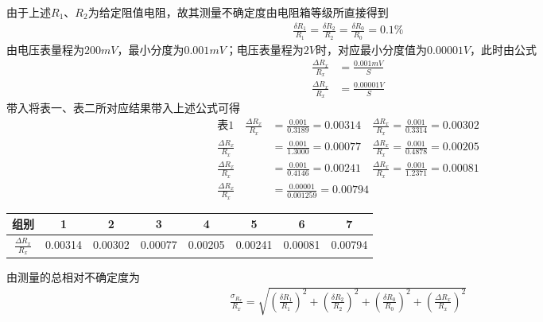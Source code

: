 \documentclass[UTF8]{ctexart}
\begin{document}
由于上述$R_1$、$R_2$为给定阻值电阻，故其测量不确定度由电阻箱等级所直接得到
\begin{align*}
    \frac{\delta R_1}{R_1} = \frac{\delta R_2}{R_2} = \frac{\delta R_0}{R_0} = 0.1\%
\end{align*}
由电压表量程为$200mV$，最小分度为$0.001mV$；电压表量程为$2V$时，对应最小分度值为$0.00001V$，此时由公式
\begin{align*}
    \frac{\Delta R_x}{R_x} &= \frac{0.001 mV}{S} \\
    \frac{\Delta R_x}{R_x} &= \frac{0.00001V}{S} 
\end{align*}
带入将表一、表二所对应结果带入上述公式可得
\begin{align*}
 \text{表1} \quad  \frac{\Delta R_x}{R_x} &= \frac{0.001}{0.3189} = 0.00314 \quad
      \frac{\Delta R_x}{R_x} = \frac{0.001}{0.3314} = 0.00302\\
    \frac{\Delta R_x}{R_x} &= \frac{0.001}{1.3000} = 0.00077\quad
    \frac{\Delta R_x}{R_x} = \frac{0.001}{0.4878} = 0.00205 \\
    \frac{\Delta R_x}{R_x} &= \frac{0.001}{0.4146} = 0.00241\quad
    \frac{\Delta R_x}{R_x} = \frac{0.001}{1.2371} = 0.00081 \\
    \frac{\Delta R_x}{R_x} &= \frac{0.00001}{0.001259} = 0.00794
\end{align*}
\begin{table}[H]
    \centering
    \begin{tabular}{|c|c|c|c|c|c|c|c|}
    \hline
        组别 &  1 & 2 & 3 & 4  & 5 & 6 & 7 \\
    \hline
       $\frac{\Delta R_x}{R_x}$  & 0.00314 & 0.00302 & 0.00077 & 0.00205 & 0.00241 & 0.00081  & 0.00794 \\
    \hline
    \end{tabular}
\end{table}
由测量的总相对不确定度为
\begin{align*}
    \frac{\sigma_{R_x}}{R_x}  = \sqrt{\left( \frac{\delta R_1}{R_1}\right)^2 +
    \left( \frac{\delta R_2}{R_2}\right)^2  + \left( \frac{\delta R_0}{R_0}\right)^2 + \left( \frac{\Delta R_x}{R_x}\right)^2}
\end{align*}
\end{document}

